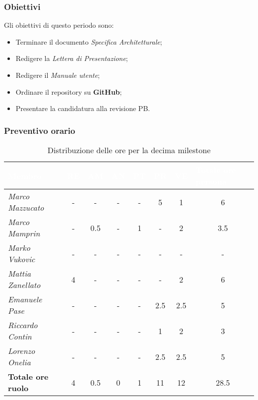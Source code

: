 \subsubsection{Obiettivi}
Gli obiettivi di questo periodo sono:
\begin{itemize}
    \item Terminare il documento \textit{Specifica Architetturale};
    \item Redigere la \textit{Lettera di Presentazione};
    \item Redigere il \textit{Manuale utente};
    \item Ordinare il repository  su \textbf{GitHub};
    \item Presentare la candidatura alla revisione PB.

\end{itemize}

\subsubsection{Preventivo orario}

\begin{table}[H]
    \renewcommand\arraystretch{1.5}
    \centering
    \begin{tabular}{|l|c|c|c|c|c|c|c|}
    \hline
    \rowcolor[HTML]{036400}
    \textcolor{white}{\textbf{Membro}} & \multicolumn{1}{l|}{\textcolor{white}{\textbf{RE}}} & \multicolumn{1}{l|}{\textcolor{white}{\textbf{AM}}} & \multicolumn{1}{l|}{\textcolor{white}{\textbf{AN}}} & \multicolumn{1}{l|}{\textcolor{white}{\textbf{PT}}} & \multicolumn{1}{l|}{\textcolor{white}{\textbf{PR}}} & \multicolumn{1}{l|}{\textcolor{white}{\textbf{VE}}} & \multicolumn{1}{l|}{\textcolor{white}{\textbf{Totale ore persona}}} \\ \hline
    \rowcolor[HTML]{EFEFEF}\textit{Marco Mazzucato}  & - & -   & -  & -    & 5   & 1    & 6     \\ \hline
    \rowcolor[HTML]{C0C0C0}\textit{Marco Mamprin}    & - & 0.5 & -  & 1    & -   & 2    & 3.5     \\ \hline
    \rowcolor[HTML]{EFEFEF}\textit{Marko Vukovic}    & - & -   & -  & -    & -   & -    & -     \\ \hline
    \rowcolor[HTML]{C0C0C0}\textit{Mattia Zanellato} & 4 & -   & -  & -    & -   & 2    & 6     \\ \hline
    \rowcolor[HTML]{EFEFEF}\textit{Emanuele Pase}    & - & -   & -  & -    & 2.5 & 2.5  & 5     \\ \hline
    \rowcolor[HTML]{C0C0C0}\textit{Riccardo Contin}  & - & -   & -  & -    & 1   & 2    & 3     \\ \hline
    \rowcolor[HTML]{EFEFEF}\textit{Lorenzo Onelia}   & - & -   & -  & -    & 2.5 & 2.5  & 5    \\ \hline
    \rowcolor[HTML]{C0C0C0}\textbf{Totale ore ruolo} & 4 & 0.5 & 0  & 1    & 11  & 12   & 28.5    \\ \hline
    \end{tabular}
    \caption{Distribuzione delle ore per la decima milestone}
\end{table}

